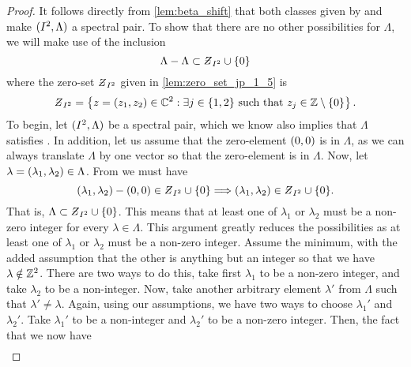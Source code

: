 \documentclass[../thesis.tex]{subfiles}
\begin{document}
\begin{proof}
    It follows directly from \cref{lem:beta_shift} that both classes given by  and  make $(I^2,\Lambda)$ a spectral pair. To show that there are no other possibilities for $\Lambda$, we will make use of the inclusion
    \begin{equation}\label{eq:inclusion_dim_2}
        \Lambda - \Lambda \subset \Zstroke_{I^2} \cup \braq{0}
    \end{equation}
    where the zero-set $\Zstroke_{I^2}$ given in \cref{lem:zero_set_jp_1_5} is
    \begin{equation*}\label{eq:zeroset_dim_2}
        \Zstroke_{I^2} = \braqMed{z = \brac{z_1,z_2} \in \C^2 : \exists \space j \in \braq{1,2} \text{ such that } z_j \in \intnozero}.
    \end{equation*}
    To begin, let $(I^2,\Lambda)$ be a spectral pair, which we know also implies that $\Lambda$ satisfies . In addition, let us assume that the zero-element $(0,0)$ is in $\Lambda$, as we can always translate $\Lambda$ by one vector so that the zero-element is in $\Lambda$. Now, let $\lambda = (\lambda_1,\lambda_2) \in \Lambda$. From  we must have
    \begin{equation*}%
        \bracMed{\lambda_1, \lambda_2} - \bracMed{0,0} \in \Zstroke_{I^2} \cup \braq{0} \Longrightarrow \brac{\lambda_1, \lambda_2} \in \Zstroke_{I^2} \cup \braq{0}.
    \end{equation*}
    That is, $\Lambda \subset \Zstroke_{I^2} \cup \braq{0}$. This means that at least one of $\lambda_1$ or $\lambda_2$ must be a non-zero integer for every $\lambda \in \Lambda$. This argument greatly reduces the possibilities as at least one of $\lambda_1$ or $\lambda_2$ must be a non-zero integer. Assume the minimum, with the added assumption that the other is anything but an integer so that we have $\lambda\notin \mathbb{Z}^2$. There are two ways to do this, take first $\lambda_1$ to be a non-zero integer, and take $\lambda_2$ to be a non-integer. Now, take another arbitrary element $\lambda'$ from $\Lambda$ such that $\lambda'\neq \lambda$. Again, using our assumptions, we have two ways to choose $\lambda_1'$ and $\lambda_2'$. Take $\lambda_1'$ to be a non-integer and $\lambda_2'$ to be a non-zero integer. Then, the fact that we now have 
    \begin{align*} %

\end{align*}
\end{proof}
\end{document}
